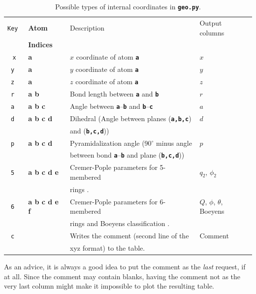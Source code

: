 \documentclass[a4paper,11pt,DIV=15,openany,twoside=false]{scrbook}
\newcommand{\ttt}[1]{\textbf{\texttt{#1}}}
\begin{document}
\begin{table}[h]
  \centering
  \caption{Possible types of internal coordinates in \ttt{geo.py}. }
  \label{tab:Geo_input}
  \begin{tabular}{>{\tt}c>{\bfseries\ttfamily}lll}
    \toprule
    \rmfamily Key         &\normalfont\rmfamily Atom      &Description    &Output columns\\
                          &\normalfont\rmfamily Indices   &               &\\
    \midrule
    x   &a              &$x$ coordinate of atom \ttt{a}         &$x$\\
    y   &a              &$y$ coordinate of atom \ttt{a}         &$y$\\
    z   &a              &$z$ coordinate of atom \ttt{a}         &$z$\\
    r   &a b            &Bond length between \ttt{a} and \ttt{b}        &$r$\\
    a   &a b c          &Angle between \ttt{a}--\ttt{b} and \ttt{b}--\ttt{c}         &$a$\\
    d   &a b c d        &Dihedral (Angle between planes (\ttt{a,b,c})    &$d$\\
                       &&and (\ttt{b,c,d}))&\\
    p   &a b c d        &Pyramidalization angle (90$^\circ$ minus angle    &$p$\\
                       &&between bond \ttt{a}--\ttt{b} and plane (\ttt{b,c,d}))&\\
    5   &a b c d e      &Cremer-Pople parameters for 5-membered&$q_2$, $\phi_2$\\
                       &&rings \cite{Cremer1975JACS}.&\\
    6   &a b c d e f    &Cremer-Pople parameters for 6-membered&$Q$, $\phi$, $\theta$, Boeyens\\
                       &&rings \cite{Cremer1975JACS} and Boeyens classification \cite{Boeyens1976JCMS}.&\\
    c   &               &Writes the comment (second line of the &Comment\\
                       &&xyz format) to the table.&\\
    \bottomrule
  \end{tabular}
\end{table}

As an advice, it is always a good idea to put the comment as the \textit{last} request, if at all. Since the comment may contain blanks, having the comment not as the very last column might make it impossible to plot the resulting table.
\end{document}
